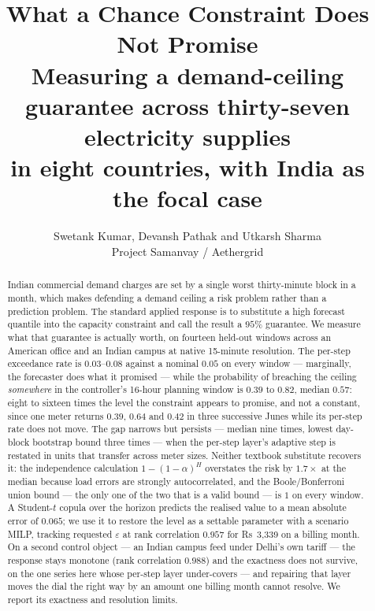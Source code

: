 \documentclass[10pt,a4paper]{article}
\title{\bf What a Chance Constraint Does Not Promise\\[2pt]
\large Measuring a demand-ceiling guarantee across thirty-seven electricity supplies\\
in eight countries, with India as the focal case}
\author{%
  Swetank Kumar, Devansh Pathak and Utkarsh Sharma\\
  \small Project Samanvay / Aethergrid
}
\date{}
\newcommand{\rupee}[1]{\textsf{Rs}~#1}
\begin{document}
\maketitle

\begin{abstract}
Indian commercial demand charges are set by a single worst thirty-minute block
in a month, which makes defending a demand ceiling a risk problem rather than a
prediction problem. The standard applied response is to substitute a high
forecast quantile into the capacity constraint and call the result a
$95\%$ guarantee. We measure what that guarantee is actually worth, on
fourteen held-out windows across an American office and an Indian campus at
native 15-minute resolution. The per-step exceedance rate is $0.03$--$0.08$
against a nominal $0.05$ on every window --- marginally, the forecaster does
what it promised --- while the probability of breaching the ceiling
\emph{somewhere} in the controller's 16-hour planning window is $0.39$ to
$0.82$, median $0.57$: eight to sixteen times the level the constraint appears
to promise, and not a constant, since one meter returns $0.39$, $0.64$ and
$0.42$ in three successive Junes while its per-step rate does not move. The gap
narrows but persists --- median nine times, lowest day-block bootstrap bound
three times --- when the per-step layer's adaptive step is restated in units
that transfer across meter sizes.
Neither textbook substitute recovers it: the independence calculation
$1-(1-\alpha)^H$ overstates the risk by $1.7\times$ at the median because
load errors are strongly autocorrelated, and the Boole/Bonferroni union bound
--- the only one of the two that is a valid bound --- is $1$ on every window.
A Student-$t$ copula over the horizon predicts the realised value to a mean
absolute error of $0.065$; we use it to restore the level as a settable
parameter with a scenario MILP, tracking requested $\varepsilon$ at rank
correlation $0.957$ for \rupee{3{,}339} on a billing month. On a second
control object --- an Indian campus feed under Delhi's own tariff --- the
response stays monotone (rank correlation $0.988$) and the exactness does not
survive, on the one series here whose per-step layer under-covers --- and
repairing that layer moves the dial the right way by an amount one billing
month cannot resolve. We report its
exactness and resolution limits.


\end{abstract}
\end{document}
